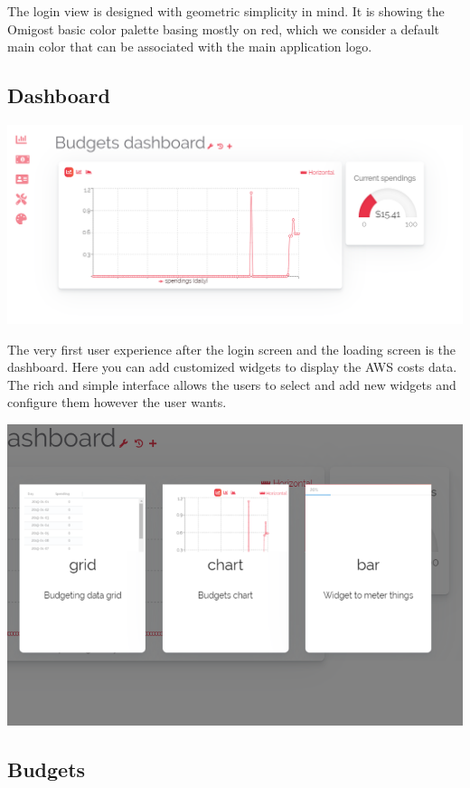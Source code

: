 \documentclass[licencjacka,en]{thesisclass}
\begin{document}
    The login view is designed with geometric simplicity in mind.
    It is showing the Omigost basic color palette basing mostly on red, which we consider
    a default main color that can be associated with the main application logo.
    
    \subsection{Dashboard}
    
    \includegraphics[width=\textwidth] {imgs/screenshots/screen_dashboard.png}

    The very first user experience after the login screen and the loading screen is the dashboard.
    Here you can add customized widgets to display the AWS costs data.
    The rich and simple interface allows the users to select and add new widgets
    and configure them however the user wants.
    
    \includegraphics[width=\textwidth] {imgs/screenshots/screen_dashboard_add.png}
    
    \subsection{Budgets}
    
\end{document}
